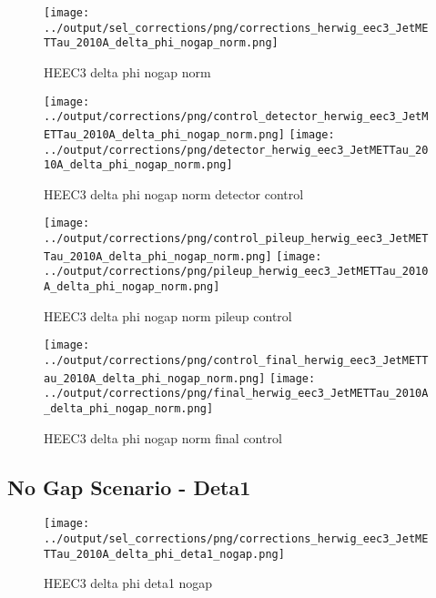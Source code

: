 \documentclass[11pt]{book}
\begin{document}
\begin{figure}[ht]
\centering
\texttt{[image: ../output/sel\_corrections/png/corrections\_herwig\_eec3\_JetMETTau\_2010A\_delta\_phi\_nogap\_norm.png]}
\caption{HEEC3 delta phi nogap norm}
\label{fig:HEEC3_JetMETTau_2010A_delta_phi_nogap_norm}
\end{figure}

\begin{figure}[ht]
\centering
\texttt{[image: ../output/corrections/png/control\_detector\_herwig\_eec3\_JetMETTau\_2010A\_delta\_phi\_nogap\_norm.png]}
\texttt{[image: ../output/corrections/png/detector\_herwig\_eec3\_JetMETTau\_2010A\_delta\_phi\_nogap\_norm.png]}
\caption{HEEC3 delta phi nogap norm detector control}
\label{fig:HEEC3_JetMETTau_2010A_delta_phi_nogap_norm_detector_control}
\end{figure}

\begin{figure}[ht]
\centering
\texttt{[image: ../output/corrections/png/control\_pileup\_herwig\_eec3\_JetMETTau\_2010A\_delta\_phi\_nogap\_norm.png]}
\texttt{[image: ../output/corrections/png/pileup\_herwig\_eec3\_JetMETTau\_2010A\_delta\_phi\_nogap\_norm.png]}
\caption{HEEC3 delta phi nogap norm pileup control}
\label{fig:HEEC3_JetMETTau_2010A_delta_phi_nogap_norm_pileup_control}
\end{figure}


\begin{figure}[ht]
\centering
\texttt{[image: ../output/corrections/png/control\_final\_herwig\_eec3\_JetMETTau\_2010A\_delta\_phi\_nogap\_norm.png]}
\texttt{[image: ../output/corrections/png/final\_herwig\_eec3\_JetMETTau\_2010A\_delta\_phi\_nogap\_norm.png]}
\caption{HEEC3 delta phi nogap norm final control}
\label{fig:HEEC3_JetMETTau_2010A_delta_phi_nogap_norm_final_control}
\end{figure}




\clearpage
\subsection{No Gap Scenario - Deta1}
\begin{figure}[ht]
\centering
\texttt{[image: ../output/sel\_corrections/png/corrections\_herwig\_eec3\_JetMETTau\_2010A\_delta\_phi\_deta1\_nogap.png]}
\caption{HEEC3 delta phi deta1 nogap}
\label{fig:HEEC3_JetMETTau_2010A_delta_phi_deta1_nogap}
\end{figure}
\end{document}
